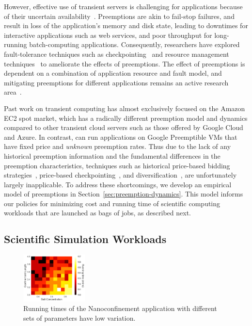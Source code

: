However, effective use of transient servers is challenging for applications because of their uncertain availability~\cite{spotcheck, prateek-thesis}. 
Preemptions are akin to fail-stop failures, and result in loss of the application's memory and disk state, leading to downtimes for interactive applications such as web services, and poor throughput for long-running batch-computing applications. 
Consequently, researchers have explored fault-tolerance techniques such as checkpointing~\cite{flint, marathe2014exploiting, spoton} and resource management techniques~\cite{exosphere} to ameliorate the effects of preemptions. %
The effect of preemptions is dependent on a combination of application resource and fault model, and mitigating preemptions for different applications remains an active research area~\cite{hourglass-eurosys19}.




  Past work on transient computing has almost exclusively focused on the Amazon EC2 spot market, which has a radically different preemption model and dynamics compared to other transient cloud servers such as those offered by Google Cloud and Azure. 
  In contrast, \sysname can run applications on Google Preemptible VMs that have fixed price and \emph{unknown} preemption rates.
  Thus due to the lack of any historical preemption information and the fundamental differences in the preemption characteristics, techniques such as historical price-based bidding strategies~\cite{bid-cloud}, price-based checkpointing~\cite{marathe2014exploiting, xinhpdc, spoton}, and diversification~\cite{exosphere, spotweb}, are unfortunately largely inapplicable. 
%
To address these shortcomings, we develop an empirical model of preemptions in Section~\ref{sec:preemption-dynamics}. 
This model informs our policies for minimizing cost and running time of scientific computing workloads that are launched as bags of jobs, as described next. 
  

\vspace*{\subsecspace}
\subsection{Scientific Simulation Workloads}
\begin{figure}[t]
  \includegraphics[width=0.3\textwidth]{../graphs/hmap.png}
    \vspace*{\myfigspace}
  \caption{Running times of the Nanoconfinement application with different sets of parameters have low variation.}
  \label{fig:heatmap}
  \vspace*{\myfigspace}
\end{figure}

